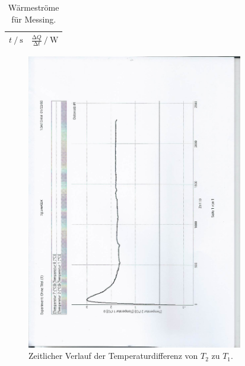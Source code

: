 \begin{table}
  \centering
  \caption{Wärmeströme für Messing.}
  \label{tab:2}
  \begin{tabular}{c c}
    \toprule
    {$t \:/\: \si{\second}$} & {$\frac{\increment{Q}}{\increment{t}} \:/\: \si{\watt}$}\\
    \midrule
    
    \bottomrule
  \end{tabular}
\end{table}


\begin{figure}
  \centering
  \includegraphics[height=13cm, angle=90]{scan-4.jpg}
  \caption{Zeitlicher Verlauf der Temperaturdifferenz von $T_2$ zu $T_1$.}
  \label{fig:3}
\end{figure}

